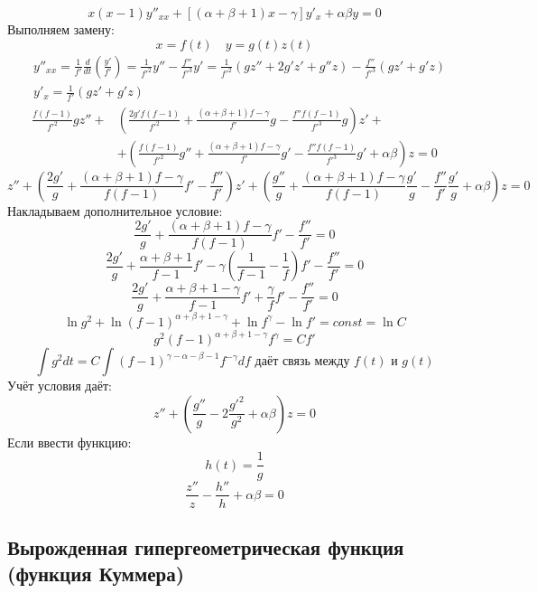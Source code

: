 \[
	x(x - 1) y''_{xx} + [(\alpha + \beta + 1)x - \gamma] y'_{x} + \alpha \beta y = 0
\]
Выполняем замену:
\[
	x = f(t) \quad y = g(t) z(t)
\]
\[
	\begin{aligned}
	& y''_{xx} = \frac{1}{f'} \frac{d}{dt} \left(\frac{y'}{f'}\right) = 
	\frac{1}{f'^2} y'' - \frac{f''}{f'^3} y'
	= \frac{1}{f'^2} (g z'' + 2 g' z' + g'' z) - \frac{f''}{f'^3} (gz' + g'z)
	\\
	& y'_x = \frac{1}{f'} (gz' + g'z)
	\end{aligned}
\]
\[
	\begin{aligned}
	\frac{f(f - 1)}{f'^2} g z'' + &
	\left(
		\frac{2g'f(f - 1)}{f'^2} + \frac{(\alpha + \beta + 1)f - \gamma}{f'} g - \frac{f''f(f - 1)}{f'^3} g
	\right) z' + \\ & +
	\left(
		\frac{f(f - 1)}{f'^2} g'' + \frac{(\alpha + \beta + 1)f - \gamma}{f'} g' - \frac{f''f(f - 1)}{f'^3} g' + \alpha \beta
	\right) z = 0
	\end{aligned}
\]
\[
	z'' + 
	\left(
		\frac{2g'}{g} + \frac{(\alpha + \beta + 1)f - \gamma}{f(f - 1)} f' - \frac{f''}{f'}
	\right) z' +
	\left(
		\frac{g''}{g}  + \frac{(\alpha + \beta + 1)f - \gamma}{f(f - 1)} \frac{g'}{g} - \frac{f''}{f'} \frac{g'}{g} + \alpha \beta
	\right) z = 0
\]
Накладываем дополнительное условие:
\[
	\frac{2g'}{g} + \frac{(\alpha + \beta + 1)f - \gamma}{f(f - 1)} f' - \frac{f''}{f'} = 0
\]
\[
	\frac{2g'}{g} + \frac{\alpha + \beta + 1}{f - 1} f' - \gamma \left(\frac{1}{f - 1} - \frac{1}{f}\right) f'- \frac{f''}{f'} = 0
\]
\[
	\frac{2g'}{g} + \frac{\alpha + \beta + 1 - \gamma}{f - 1} f' + \frac{\gamma}{f} f'- \frac{f''}{f'} = 0
\]
\[
	\ln g^2 + \ln (f - 1)^{\alpha + \beta + 1 - \gamma} + \ln f^\gamma - \ln f' = const = \ln C
\]
\[
	g^2 (f - 1)^{\alpha + \beta + 1 - \gamma} f^\gamma = C f'
\]
\[
	\int g^2 dt = C \int (f - 1)^{\gamma - \alpha - \beta - 1} f^{-\gamma} df \text{ даёт связь между $f(t)$ и $g(t)$}
\]
Учёт условия даёт:
\[
	z'' + 
	\left(
		\frac{g''}{g}  - 2 \frac{g'^2}{g^2} + \alpha \beta
	\right) z = 0	
\]
Если ввести функцию:
\[
	h(t) = \frac{1}{g}
\]
\[
	\frac{z''}{z} - 
	\frac{h''}{h} + \alpha \beta
	 = 0	
\]

\subsection{Вырожденная гипергеометрическая функция (функция Куммера)}

